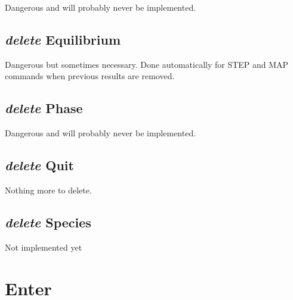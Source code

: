 \documentclass[12pt]{article}
\begin{document}
Dangerous and will probably never be implemented.

\subsection{{\em delete} Equilibrium}

Dangerous but sometimes necessary.  Done automatically for STEP and
MAP commands when previous results are removed.

\subsection{{\em delete} Phase}

Dangerous and will probably never be implemented.

\subsection{{\em delete} Quit}

Nothing more to delete.

\subsection{{\em delete} Species}

Not implemented yet

\section{Enter }
\end{document}
